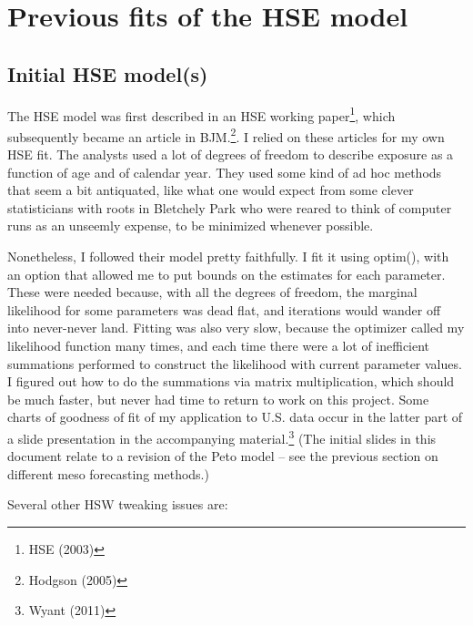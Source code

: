\documentclass{article}\usepackage{graphicx, color}
\begin{document}
\FloatBarrier


\section{Previous fits of the HSE model}

\subsection{ Initial HSE model(s)}
The HSE model was first described in an HSE working paper\footnote{HSE (2003)}, which subsequently became an article in BJM.\footnote{Hodgson (2005)}.  I relied on these articles for my own HSE fit.  The analysts used a lot of degrees of freedom to describe exposure as a function of age and of calendar year.  They used some kind of ad hoc methods that seem a bit antiquated, like what one would expect from some clever statisticians with roots in Bletchely Park who were reared to think of computer runs as an unseemly expense, to be minimized whenever possible.  

Nonetheless, I followed their model pretty faithfully.  I fit it using optim(), with an option that allowed me to put bounds on the estimates for each parameter.  These were needed because, with all the degrees of freedom, the marginal likelihood for some parameters was dead flat, and iterations would wander off into never-never land.  Fitting was also very slow, because the optimizer called my likelihood function many times, and each time there were a lot of inefficient summations performed to construct the likelihood with current parameter values.  I figured out how to do the summations via matrix multiplication, which should be much faster, but never had time to return to work on this project.  Some charts of goodness of fit of my application to U.S. data occur in the latter part of a slide presentation in the accompanying material.\footnote{Wyant (2011)}  (The initial slides in this document relate to a revision of the Peto model -- see the previous section on different meso forecasting methods.)

Several other HSW tweaking issues are:
\end{document}
